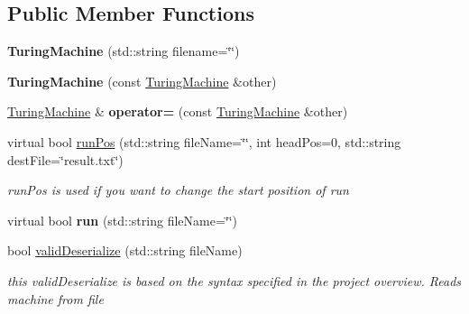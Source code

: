 \subsection*{Public Member Functions}
\begin{DoxyCompactItemize}
\item 
\mbox{\label{class_turing_machine_abb09396f99114e2328c92a1f0869b6d2}} 
{\bfseries Turing\+Machine} (std\+::string filename=\char`\"{}\char`\"{})
\item 
\mbox{\label{class_turing_machine_a00cb86fbf9ba3e3771c5b6176f956b4a}} 
{\bfseries Turing\+Machine} (const \mbox{\hyperlink{class_turing_machine}{Turing\+Machine}} \&other)
\item 
\mbox{\label{class_turing_machine_a51792d43e9f52e2a70012e74b858e9bb}} 
\mbox{\hyperlink{class_turing_machine}{Turing\+Machine}} \& {\bfseries operator=} (const \mbox{\hyperlink{class_turing_machine}{Turing\+Machine}} \&other)
\item 
\mbox{\label{class_turing_machine_a53f77ff296ce8aa297dd874045afcbef}} 
virtual bool \mbox{\hyperlink{class_turing_machine_a53f77ff296ce8aa297dd874045afcbef}{run\+Pos}} (std\+::string file\+Name=\char`\"{}\char`\"{}, int head\+Pos=0, std\+::string dest\+File=\char`\"{}result.\+txt\char`\"{})
\begin{DoxyCompactList}\small\item\em run\+Pos is used if you want to change the start position of run \end{DoxyCompactList}\item 
\mbox{\label{class_turing_machine_a0c7069a028f4dd7dfaef7e7a01b5f76a}} 
virtual bool {\bfseries run} (std\+::string file\+Name=\char`\"{}\char`\"{})
\item 
\mbox{\label{class_turing_machine_a2576f9427faf1671adf761dda185ed54}} 
bool \mbox{\hyperlink{class_turing_machine_a2576f9427faf1671adf761dda185ed54}{valid\+Deserialize}} (std\+::string file\+Name)
\begin{DoxyCompactList}\small\item\em this valid\+Deserialize is based on the syntax specified in the project overview. Reads machine from file \end{DoxyCompactList}\item 

\end{DoxyCompactItemize}
